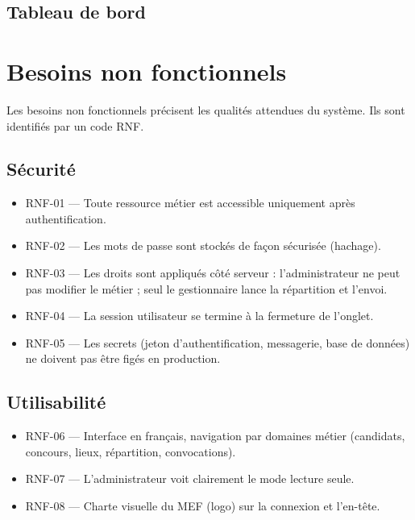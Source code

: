 \begin{onehalfspace}
\subsection{Tableau de bord}


\section{Besoins non fonctionnels}

Les besoins non fonctionnels précisent les qualités attendues du système. Ils sont identifiés par un code RNF.

\subsection{Sécurité}

\begin{itemize}
  \item RNF-01 --- Toute ressource métier est accessible uniquement après authentification.
  \item RNF-02 --- Les mots de passe sont stockés de façon sécurisée (hachage).
  \item RNF-03 --- Les droits sont appliqués côté serveur : l'administrateur ne peut pas modifier le métier ; seul le gestionnaire lance la répartition et l'envoi.
  \item RNF-04 --- La session utilisateur se termine à la fermeture de l'onglet.
  \item RNF-05 --- Les secrets (jeton d'authentification, messagerie, base de données) ne doivent pas être figés en production.
\end{itemize}

\subsection{Utilisabilité}

\begin{itemize}
  \item RNF-06 --- Interface en français, navigation par domaines métier (candidats, concours, lieux, répartition, convocations).
  \item RNF-07 --- L'administrateur voit clairement le mode lecture seule.
  \item RNF-08 --- Charte visuelle du MEF (logo) sur la connexion et l'en-tête.
\end{itemize}


\end{onehalfspace}
